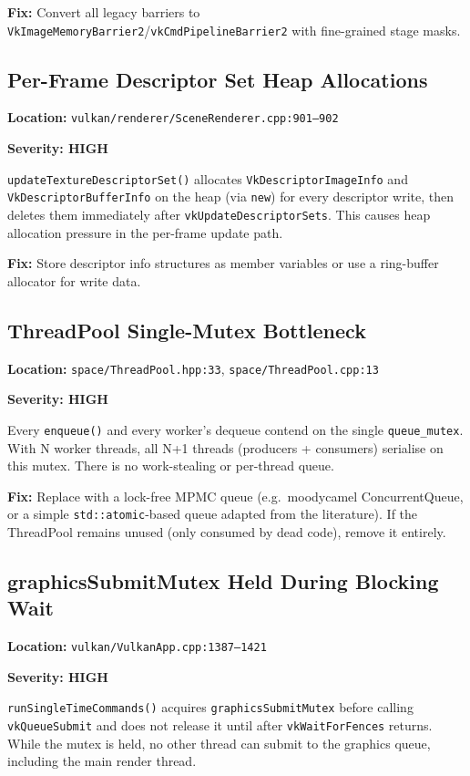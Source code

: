 \documentclass[a4paper,11pt]{article}
\begin{document}
\textbf{Fix:} Convert all legacy barriers to
\texttt{VkImageMemoryBarrier2}/\texttt{vkCmdPipelineBarrier2} with
fine-grained stage masks.

\subsection{Per-Frame Descriptor Set Heap Allocations}

\textbf{Location:} \texttt{vulkan/renderer/SceneRenderer.cpp:901--902}

\textbf{Severity: HIGH}

\texttt{updateTexture\-DescriptorSet()} allocates
\texttt{VkDescriptorImageInfo} and \texttt{VkDescriptorBufferInfo} on the
heap (via \texttt{new}) for every descriptor write, then deletes them
immediately after \texttt{vkUpdateDescriptorSets}. This causes heap
allocation pressure in the per-frame update path.

\textbf{Fix:} Store descriptor info structures as member variables or use
a ring-buffer allocator for write data.

\subsection{ThreadPool Single-Mutex Bottleneck}

\textbf{Location:} \texttt{space/ThreadPool.hpp:33},
\texttt{space/ThreadPool.cpp:13}

\textbf{Severity: HIGH}

Every \texttt{enqueue()} and every worker's dequeue contend on the single
\texttt{queue\_mutex}. With N worker threads, all N+1 threads (producers +
consumers) serialise on this mutex. There is no work-stealing or per-thread
queue.

\textbf{Fix:} Replace with a lock-free MPMC queue (e.g.\ moodycamel
ConcurrentQueue, or a simple \texttt{std::atomic}-based queue adapted from
the literature). If the ThreadPool remains unused (only consumed by dead
code), remove it entirely.

\subsection{graphicsSubmitMutex Held During Blocking Wait}

\textbf{Location:} \texttt{vulkan/VulkanApp.cpp:1387--1421}

\textbf{Severity: HIGH}

\texttt{runSingleTime\-Commands()} acquires \texttt{graphics\-Submit\-Mutex}
before calling \texttt{vkQueueSubmit} and does not release it until after
\texttt{vkWaitForFences} returns. While the mutex is held, no other thread
can submit to the graphics queue, including the main render thread.
\end{document}
